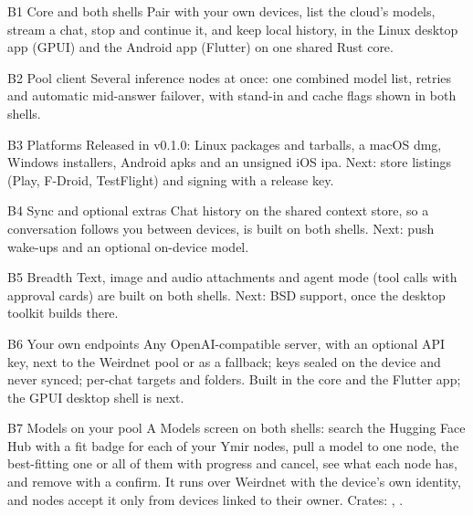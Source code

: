 \begin{rowlist}
  \item[B1 Core and both shells \status{Done}] Pair with your own devices, list the cloud's models, stream a chat, stop and continue it, and keep local history, in the Linux desktop app (GPUI) and the Android app (Flutter) on one shared Rust core.
  \item[B2 Pool client \status{Done}] Several inference nodes at once: one combined model list, retries and automatic mid-answer failover, with stand-in and cache flags shown in both shells.
  \item[B3 Platforms \status{In progress}] Released in v0.1.0: Linux packages and tarballs, a macOS dmg, Windows installers, Android apks and an unsigned iOS ipa. Next: store listings (Play, F-Droid, TestFlight) and signing with a release key.
  \item[B4 Sync and optional extras \status{In progress}] Chat history on the shared context store, so a conversation follows you between devices, is built on both shells. Next: push wake-ups and an optional on-device model.
  \item[B5 Breadth \status{In progress}] Text, image and audio attachments and agent mode (tool calls with approval cards) are built on both shells. Next: BSD support, once the desktop toolkit builds there.
  \item[B6 Your own endpoints \status{In progress}] Any OpenAI-compatible server, with an optional API key, next to the Weirdnet pool or as a fallback; keys sealed on the device and never synced; per-chat targets and folders. Built in the core and the Flutter app; the GPUI desktop shell is next.
  \item[B7 Models on your pool \status{In progress}] A Models screen on both shells: search the Hugging Face Hub with a fit badge for each of your Ymir nodes, pull a model to one node, the best-fitting one or all of them with progress and cancel, see what each node has, and remove with a confirm. It runs over Weirdnet with the device's own identity, and nodes accept it only from devices linked to their owner. Crates: , .
\end{rowlist}
